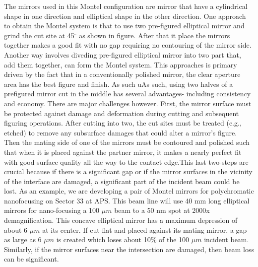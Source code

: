 The mirrors used in this Montel configuration are mirror that have a cylindrical shape in one direction and elliptical shape in the other direction. One approach to obtain the Montel system is that to use two pre-figured elliptical mirror and grind the cut site at 45$^\circ $ as shown in figure. After that it place the mirrors together makes a good fit with no gap requiring no contouring of the mirror side. Another way involves diveding pre-figured elliptical mirror into two part that, add them together, can form the Montel system. This approaches is primary driven by the fact that in a conventionally polished mirror, the clear aperture area has the best figure and finish. As such uAs such, using two halves of a prefigured mirror cut in the middle has several advantages- including consistency and economy. There are major challenges
however. First, the mirror surface must be protected against damage and deformation during cutting and subsequent figuring operations. After cutting into two, the cut sites must be treated (e.g., etched) to remove any subsurface damages that could alter a mirror's figure. Then the mating side of one of the mirrors must be contoured and polished such that when it is placed against the partner mirror, it makes a nearly perfect fit with good surface quality all the way to the contact edge.This last two-steps are crucial because if there is a significant gap or if the mirror surfaces in the vicinity of the interface are damaged, a significant part of the incident beam could be lost. As an example, we are developing a pair of Montel mirrors for polychromatic nanofocusing on Sector 33 at APS. This beam line will use 40 mm long elliptical mirrors for nano-focusing a 100 $\mu m$ beam to a 50 nm spot at 2000x demagnification. This concave elliptical mirror has a maximum depression of about 6 $\mu m$ at its center. If cut flat and placed against its mating mirror, a gap as large as 6 $\mu m$ is created which loses about 10$\% $ of the 100 $\mu m$ incident beam. Similarly, if the mirror surfaces near the intersection are damaged, then beam loss can be significant.